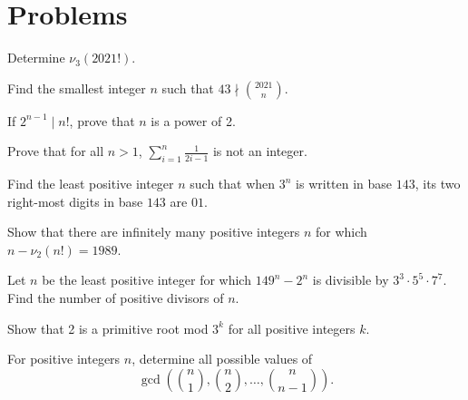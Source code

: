 \documentclass{article}
\begin{document}
\pagebreak
\section{Problems}



\begin{prob}[]{1}
Determine $\nu_3(2021!)$.
\end{prob}

\begin{prob}[]{1}
Find the smallest integer $n$ such that $43\nmid \binom{2021}n$.
\end{prob}

\begin{req}[Classic]{2}
If $2^{n-1}\mid n!$, prove that $n$ is a power of 2.
\end{req}

\begin{prob}[Classic]{2}
Prove that for all $n>1$, $\sum_{i=1}^n\frac1{2i-1}$ is not an integer.
\end{prob}

\begin{prob}[AIME I 2018/11]{3}
Find the least positive integer $n$ such that when $3^n$ is written in base $143$, its two right-most digits in base $143$ are $01$.
\end{prob}

\begin{prob}{3}
Show that there are infinitely many positive integers $n$ for which $n-\nu_2(n!)=1989$.
\end{prob}

\begin{req}[AIME I 2020/12]{4}
Let $n$ be the least positive integer for which $149^n - 2^n$ is divisible by $3^3 \cdot 5^5 \cdot 7^7$. Find the number of positive divisors of $n$.
\end{req}

\begin{prob}{4}
Show that 2 is a primitive root mod $3^k$ for all positive integers $k$.
\end{prob}

\begin{prob}[Classic]{4}
For positive integers $n$, determine all possible values of \[\gcd\left( \binom n1,\binom n2,\dots,\binom n{n-1} \right).\]
\end{prob}
\end{document}
